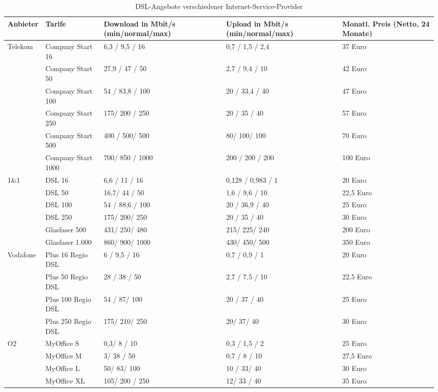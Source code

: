 \documentclass[fontsize=12pt,paper=a4,open=any,parskip=half,
  twoside=false,toc=listof,toc=bibliography,fleqn,leqno,
  captions=nooneline,captions=tableabove,british]{scrbook}
\begin{document}
\begin{table}[H]
\caption{DSL-Angebote verschiedener Internet-Service-Provider}
\label{dsl}
\centering
  \begin{tabular}{p{1.5cm} p{2.5cm} p{4cm} p{4cm} p{2.4cm}} 
\toprule
    Anbieter & Tarife & Download in Mbit/s (min/normal/max) & Upload in Mbit/s (min/normal/max)& Monatl. Preis (Netto, 24 Monate) \\
\midrule 
    	Telekom & Company Start 16 &  6,3 / 9,5 / 16 & 0,7 / 1,5 / 2,4 & 37 Euro\\
    	&Company Start 50&27,9 / 47 / 50&2,7 / 9,4 / 10& 42 Euro\\
	&Company Start 100&54 / 83,8 / 100&20 / 33,4 / 40& 47 Euro\\
	&Company Start 250&175/ 200 / 250&20 / 35 / 40& 57 Euro\\
	&Company Start 500&400 / 500/ 500&80/ 100/ 100& 70 Euro\\
	&Company Start 1000&700/ 850 / 1000&200 / 200 / 200& 100 Euro\\
	1\&1	&DSL 16	&6,6 / 11 / 16	&0,128 / 0,983 / 1		& 20 Euro\\
 	&DSL 50	&16,7/ 44 / 50&	1,6 / 9,6 / 10&		22,5 Euro\\
 	&DSL 100	&54 / 88,6 / 100	&20 / 36,9 / 40&		25 Euro\\
 	&DSL 250&	175/ 200/ 250	& 20 / 35 / 40		& 30 Euro\\
	&Glasfaser 500&	431/ 250/ 480	 &215/ 225/ 240	&	200 Euro\\
 	&Glasfaser 1.000&	860/ 900/ 1000	&430/ 450/ 500&	350 Euro\\
	Vodafone& Plus 16 Regio DSL&	6 / 9,5 / 16&	0,7 / 0,9 / 1&		20 Euro\\
 	&Plus 50 Regio DSL&	28 / 38 / 50&	2,7 / 7,5 / 10&		22,5 Euro\\
 	&Plus 100 Regio DSL&	54 / 87/ 100&	20 / 37 / 40&		25 Euro\\
 	&Plus 250 Regio DSL&	175/ 210/ 250& 	20/ 37/ 40	&	30 Euro\\

	
	O2 &MyOffice S&	0,3/ 8 / 10	& 0,3 / 1,5 / 2&		25 Euro\\
 	&MyOffice M&	3/ 38 / 50&	0,7 / 8 / 10&		27,5 Euro\\
 	&MyOffice L&	50/ 83/ 100&	10 / 33/ 40&		30 Euro\\
 	&MyOffice XL&	105/ 200 / 250&	12/ 33 / 40&		35 Euro\\

  \end{tabular}

\end{table}
\end{document}
